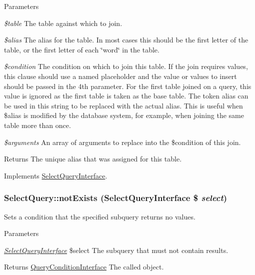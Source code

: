 \begin{DoxyParams}{Parameters}
\item[{\em \$table}]The table against which to join. \item[{\em \$alias}]The alias for the table. In most cases this should be the first letter of the table, or the first letter of each \char`\"{}word\char`\"{} in the table. \item[{\em \$condition}]The condition on which to join this table. If the join requires values, this clause should use a named placeholder and the value or values to insert should be passed in the 4th parameter. For the first table joined on a query, this value is ignored as the first table is taken as the base table. The token alias can be used in this string to be replaced with the actual alias. This is useful when \$alias is modified by the database system, for example, when joining the same table more than once. \item[{\em \$arguments}]An array of arguments to replace into the \$condition of this join. \end{DoxyParams}
\begin{DoxyReturn}{Returns}
The unique alias that was assigned for this table. 
\end{DoxyReturn}


Implements \hyperlink{interfaceSelectQueryInterface_ab3dcfdd428727d5a2f4890296807b27a}{SelectQueryInterface}.\hypertarget{classSelectQuery_a800e7ee63d0d648483953bb6961738ca}{
\subsubsection[{notExists}]{\setlength{\rightskip}{0pt plus 5cm}SelectQuery::notExists ({\bf SelectQueryInterface} \$ {\em select})}}
\label{classSelectQuery_a800e7ee63d0d648483953bb6961738ca}
Sets a condition that the specified subquery returns no values.


\begin{DoxyParams}{Parameters}
\item[{\em \hyperlink{interfaceSelectQueryInterface}{SelectQueryInterface}}]\$select The subquery that must not contain results.\end{DoxyParams}
\begin{DoxyReturn}{Returns}
\hyperlink{interfaceQueryConditionInterface}{QueryConditionInterface} The called object. 
\end{DoxyReturn}


